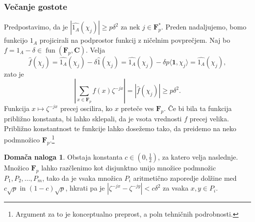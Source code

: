 \documentclass[11pt]{book}
\def\CC{\mathbf{C}}
\def\11{\mathbf{1}}
\def\FF{\mathbf{F}}
\DeclareMathOperator\fun{fun}
\theoremstyle{definition}
\theoremstyle{zgled}
\theoremstyle{odprtproblem}
\theoremstyle{domacanaloga}
\newtheorem*{domacanaloga}{Domača naloga}
\theoremstyle{izrek}
\begin{document}
\subsubsection{Večanje gostote}

Predpostavimo, da je $|\widehat{1_A}(\chi_j)| \geq p \delta^2$ za nek $j \in \FF_p^*$. Preden nadaljujemo, bomo funkcijo $1_A$ projicirali na podprostor funkcij z ničelnim povprečjem. Naj bo $f = 1_A - \delta \in \fun(\FF_p, \CC)$. Velja
\[
    \widehat{f}(\chi_j) = \widehat{1_A}(\chi_j) - \delta \widehat{1}(\chi_j)
    = \widehat{1_A}(\chi_j) - \delta p \langle \11, \chi_j \rangle
    = \widehat{1_A}(\chi_j),
\]
zato je
\[
    \left|\sum_{x \in \FF_p} f(x) \zeta^{-jx}\right| = |\widehat{f}(\chi_j)| \geq p \delta^2.
\]
Funkcija $x \mapsto \zeta^{-jx}$ precej oscilira, ko $x$ preteče ves $\FF_p$. Če bi bila ta funkcija približno konstanta, bi lahko sklepali, da je vsota vrednosti $f$ precej velika. Približno konstantnost te funkcije lahko dosežemo tako, da preidemo na neko podmnožico $\FF_p$.\footnote{Argument za to je konceptualno preprost, a poln tehničnih podrobnosti.}

\begin{domacanaloga}
Obstaja konstanta $c \in (0,\frac12)$, za katero velja naslednje. Množico $\FF_p$ lahko razčlenimo kot disjunktno unijo množice podmnožic $P_1, P_2, \dots, P_m$, tako da je vsaka množica $P_i$ aritmetično zaporedje dolžine med $c \sqrt{p}$ in $(1-c) \sqrt{p}$, hkrati pa je $|\zeta^{-jx} - \zeta^{-jy}| < c \delta^2$ za vsaka $x,y \in P_i$.
\end{domacanaloga}
\end{document}
